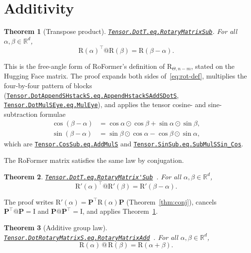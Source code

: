 \documentclass[11pt,a4paper]{article}
\newcommand{\lmod}[1]{\href{http://www.lemma.cn/lean/?module=#1}{\nolinkurl{#1}}}
\newtheorem{theorem}{Theorem}[section]
\newcommand{\R}{\mathbb{R}}
\newcommand{\rot}{\mathrm{R}}
\newcommand{\eye}{\mathrm{I}}
\begin{document}
\section{Additivity}
\label{sec:add}

\begin{theorem}[Transpose product]
\label{thm:dotT}
\lmod{Tensor.DotT.eq.RotaryMatrixSub}.
For all \(\alpha,\beta\in\R^d\),
\begin{equation}
  \rot(\alpha)^\top @ \rot(\beta) = \rot(\beta-\alpha).
\end{equation}
\end{theorem}

This is the free-angle form of RoFormer's definition of \(\rot_{\Theta,n-m}\), stated on the Hugging Face matrix.
The proof expands both sides of~\eqref{eq:rot-def}, multiplies the four-by-four pattern of blocks
(\lmod{Tensor.DotAppendSHstackS.eq.AppendHstackSAddSDotS},
\lmod{Tensor.DotMulSEye.eq.MulEye}),
and applies the tensor cosine- and sine-subtraction formulae
\begin{align}
  \cos(\beta-\alpha)&=\cos\alpha\odot\cos\beta+\sin\alpha\odot\sin\beta,
  \label{eq:cos-sub}\\
  \sin(\beta-\alpha)&=\sin\beta\odot\cos\alpha-\cos\beta\odot\sin\alpha,
  \label{eq:sin-sub}
\end{align}
which are
\lmod{Tensor.CosSub.eq.AddMulS} and
\lmod{Tensor.SinSub.eq.SubMulSSin_Cos}.

The RoFormer matrix satisfies the same law by conjugation.

\begin{theorem}
\label{thm:dotTp}
\lmod{Tensor.DotT.eq.RotaryMatrix'Sub}~\cite{lemma_rope_su_sub}.
For all \(\alpha,\beta\in\R^d\),
\begin{equation}
  \rot'(\alpha)^\top @ \rot'(\beta) = \rot'(\beta-\alpha).
\end{equation}
\end{theorem}

The proof writes \(\rot'(\alpha)=\boldsymbol{P}^\top\rot(\alpha)\boldsymbol{P}\) (Theorem~\ref{thm:conj}), cancels \(\boldsymbol{P}^\top@\boldsymbol{P}=\eye\) and \(\boldsymbol{P}@\boldsymbol{P}^\top=\eye\), and applies Theorem~\ref{thm:dotT}.

\begin{theorem}[Additive group law]
\label{thm:add}
\lmod{Tensor.DotRotaryMatrixS.eq.RotaryMatrixAdd}~\cite{lemma_rope_add}.
For all \(\alpha,\beta\in\R^d\),
\begin{equation}
  \rot(\alpha)\,@\,\rot(\beta) = \rot(\alpha+\beta).
\end{equation}
\end{theorem}
\end{document}
